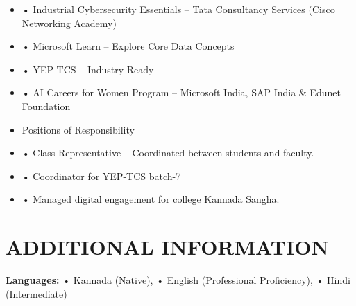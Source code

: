 \documentclass[10pt,a4paper]{article}
\begin{document}
\begin{itemize}[leftmargin=*]
    \item • Industrial Cybersecurity Essentials – Tata Consultancy Services (Cisco Networking Academy)
    \item • Microsoft Learn – Explore Core Data Concepts
    \item • YEP TCS – Industry Ready
    \item • AI Careers for Women Program – Microsoft India, SAP India \& Edunet Foundation
    \item Positions of Responsibility
    \item • Class Representative – Coordinated between students and faculty.
    \item • Coordinator for YEP-TCS batch-7
    \item • Managed digital engagement for college Kannada Sangha.
\end{itemize}



\section*{ADDITIONAL INFORMATION}

\textbf{Languages:} • Kannada (Native), • English (Professional Proficiency), • Hindi (Intermediate)
\end{document}
